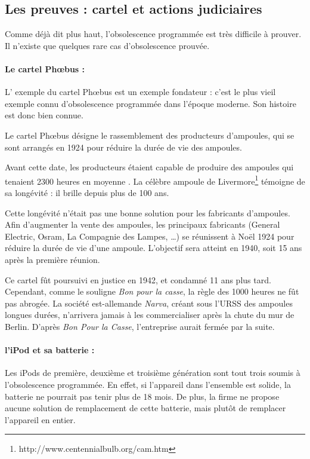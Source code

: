 \subsection{Les preuves : cartel et actions judiciaires}



Comme déjà dit plus haut, l'obsolescence programmée est très difficile à prouver. Il n'existe que quelques rare cas d'obsolescence prouvée. 

\paragraph*{Le cartel Phœbus : } L' exemple du cartel Phœbus est un exemple fondateur : c'est le plus vieil exemple connu d'obsolescence programmée dans l'époque moderne. Son histoire est donc bien connue. 

Le cartel Phœbus désigne le rassemblement des producteurs d'ampoules, qui se sont arrangés en 1924 pour réduire la durée de vie des ampoules. 

Avant cette date, les producteurs étaient capable de produire des ampoules qui tenaient 2300 heures en moyenne \cite{opes_PHOEBUS}. La célèbre ampoule de Livermore\footnote{http://www.centennialbulb.org/cam.htm} témoigne de sa longévité : il brille depuis plus de 100 ans. 

Cette longévité n'était pas une bonne solution pour les fabricants d'ampoules. Afin d'augmenter la vente des ampoules,  les principaux fabricants (General Electric, Osram, La Compagnie des Lampes, \dots) se réunissent à Noël 1924 pour réduire la durée de vie d'une ampoule. L'objectif sera atteint  en 1940, soit 15 ans après la première réunion. 

Ce cartel fût poursuivi en justice en 1942, et condamné 11 ans plus tard. Cependant, comme le souligne \textit{Bon pour la casse}, la règle des 1000 heures ne fût pas abrogée. La société est-allemande \textit{Narva}, créant sous l'URSS des ampoules longues durées, n'arrivera jamais à les commercialiser après la chute du mur de Berlin. D'après \textit{Bon Pour la Casse}, l'entreprise aurait fermée par la suite. 

\paragraph*{l'iPod et sa batterie : } Les iPods de première, deuxième et troisième génération sont tout trois soumis à l'obsolescence programmée. En effet, si l'appareil dans l'ensemble est solide, la batterie ne pourrait pas tenir plus de 18 mois\cite{cec-zevRapportObsProg}. De plus, la firme ne propose aucune solution de remplacement de cette batterie, mais plutôt de remplacer l'appareil en entier. 


